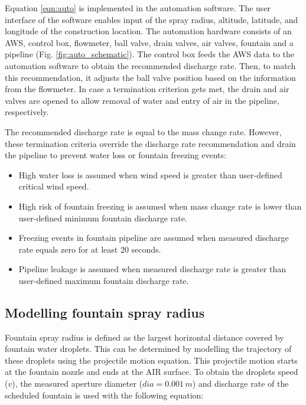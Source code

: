\documentclass[tc, manuscript]{copernicus}
\begin{document}
Equation \ref{eqn:auto} is implemented in the automation software. The user interface of the software enables
input of the spray radius, altitude, latitude, and longitude of the construction location. The automation
hardware consists of an AWS, control box, flowmeter, ball valve, drain valves, air valves, fountain and a
pipeline (Fig. \ref{fig:auto_schematic}). The control box feeds the AWS data to the automation software to
obtain the recommended discharge rate. Then, to match this recommendation, it adjusts the ball valve position
based on the information from the flowmeter. In case a termination criterion gets met, the drain and air valves
are opened to allow removal of water and entry of air in the pipeline, respectively.

The recommended discharge rate is equal to the mass change rate. However, these termination criteria override
the discharge rate recommendation and drain the pipeline to prevent water loss or fountain freezing events:

\begin{itemize}

\item High water loss is assumed when wind speed is greater than user-defined critical wind speed.

\item High risk of fountain freezing is assumed when mass change rate is lower than user-defined minimum
  fountain discharge rate. 

\item Freezing events in fountain pipeline are assumed when measured discharge rate equals zero for at least 20
  seconds. 

\item Pipeline leakage is assumed when measured discharge rate is greater than user-defined maximum fountain
  discharge rate.

\end{itemize}

\subsection{Modelling fountain spray radius} \label{sec:r_F}

Fountain spray radius is defined as the largest horizontal distance covered by fountain water droplets. This can
be determined by modelling the trajectory of these droplets using the projectile motion equation. This
projectile motion starts at the fountain nozzle and ends at the AIR surface.  To obtain the droplets speed
($v$), the measured aperture diameter ($dia = 0.001\, m$) and discharge rate of the scheduled fountain is used
with the following equation:
\end{document}
